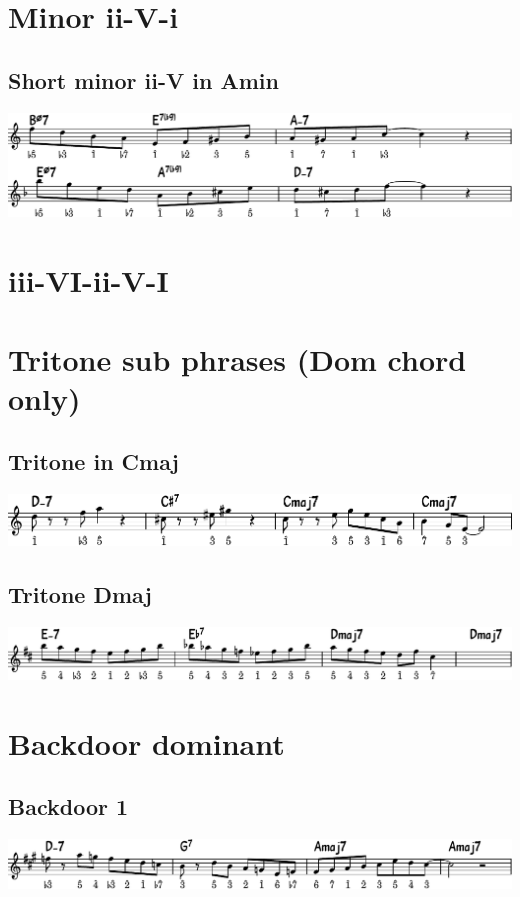 \documentclass[11pt]{article}
\begin{document}
\section{Minor ii-V-i}
\label{sec:org8390d6a}
\subsection{Short minor ii-V in Amin}
\label{sec:orgdaaf764}
\begin{center}
\includegraphics[width=.98\linewidth]{short-ii-v-in-Amin.pdf}
\end{center}

\section{iii-VI-ii-V-I}
\label{sec:org83c45ce}
\section{Tritone sub phrases (Dom chord only)}
\label{sec:org9ce8159}

\subsection{Tritone in Cmaj}
\label{sec:org3f59864}
\begin{center}
\includegraphics[width=.98\linewidth]{tritone-c-maj.pdf}
\end{center}

\subsection{Tritone Dmaj}
\label{sec:org74ecf25}
\begin{center}
\includegraphics[width=.98\linewidth]{tritone-d-maj.pdf}
\end{center}


\section{Backdoor dominant}
\label{sec:org0febfec}

\subsection{Backdoor 1}
\label{sec:org0014bcf}
\begin{center}
\includegraphics[width=.98\linewidth]{backdoor-1.pdf}
\end{center}
\end{document}
